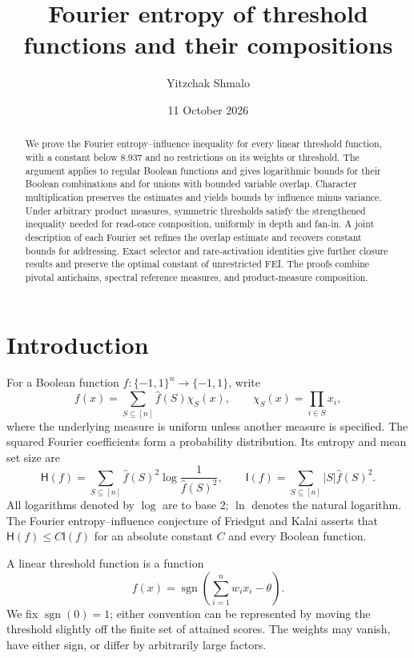 \documentclass[11pt]{amsart}
\title[Fourier entropy of threshold functions]{Fourier entropy of threshold functions and their compositions}
\author{Yitzchak Shmalo}
\date{11 October 2026}
\theoremstyle{definition}
\theoremstyle{remark}
\newcommand{\bits}{\{-1,1\}}
\newcommand{\HH}{\mathsf H}
\newcommand{\I}{\mathsf I}
\newcommand{\wh}[1]{\widehat{#1}}
\begin{document}
\begin{abstract}
We prove the Fourier entropy--influence inequality for every linear threshold function, with a constant below $8.937$ and no restrictions on its weights or threshold. The argument applies to regular Boolean functions and gives logarithmic bounds for their Boolean combinations and for unions with bounded variable overlap. Character multiplication preserves the estimates and yields bounds by influence minus variance. Under arbitrary product measures, symmetric thresholds satisfy the strengthened inequality needed for read-once composition, uniformly in depth and fan-in. A joint description of each Fourier set refines the overlap estimate and recovers constant bounds for addressing. Exact selector and rare-activation identities give further closure results and preserve the optimal constant of unrestricted FEI. The proofs combine pivotal antichains, spectral reference measures, and product-measure composition.
\end{abstract}
\maketitle
\enlargethispage{3pt}

\section{Introduction}

For a Boolean function $f:\bits^n\to\bits$, write
\[
 f(x)=\sum_{S\subseteq[n]}\wh f(S)\chi_S(x),
 \qquad
 \chi_S(x)=\prod_{i\in S}x_i,
\]
where the underlying measure is uniform unless another measure is specified.
The squared Fourier coefficients form a probability distribution. Its entropy and mean set size are
\begin{equation}\label{eq:HI}
 \HH(f)=\sum_{S\subseteq[n]}\wh f(S)^2\log\frac1{\wh f(S)^2},
 \qquad
 \I(f)=\sum_{S\subseteq[n]}|S|\wh f(S)^2.
\end{equation}
All logarithms denoted by $\log$ are to base $2$; $\ln$ denotes the natural logarithm.
The Fourier entropy--influence conjecture of Friedgut and Kalai \cite{FK96} asserts that
$\HH(f)\le C\I(f)$ for an absolute constant $C$ and every Boolean function.

A linear threshold function is a function
\begin{equation}\label{eq:ltf}
 f(x)=\operatorname{sgn}\left(\sum_{i=1}^n w_i x_i-\theta\right).
\end{equation}
We fix $\operatorname{sgn}(0)=1$; either convention can be represented by moving the threshold slightly off the finite set of attained scores. The weights may vanish, have either sign, or differ by arbitrarily large factors.
\end{document}
